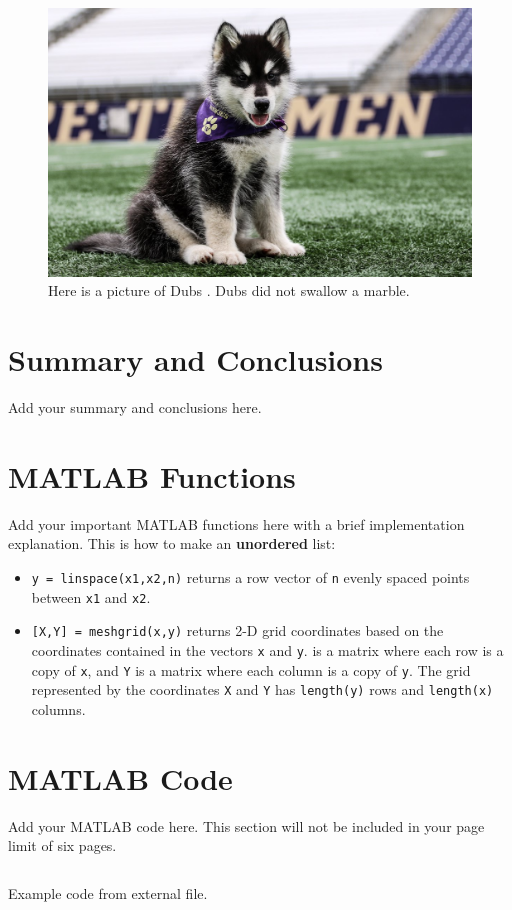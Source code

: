 \documentclass{article}
\begin{document}
\begin{figure}
    \centering
    \includegraphics[width=0.5\linewidth]{dubs.jpg}
    \caption{Here is a picture of Dubs \cite{webeck_2018}. Dubs did not swallow
        a marble.}
    \label{fig:dubs}
\end{figure}

\section{Summary and Conclusions}
Add your summary and conclusions here.

\printbibliography

\begin{appendices}

    \section{MATLAB Functions}
    Add your important MATLAB functions here with a brief implementation
    explanation. This is how to make an \textbf{unordered} list:
    \begin{itemize}
        \item \texttt{y = linspace(x1,x2,n)} returns a row vector of \texttt{n}
              evenly spaced points between \texttt{x1} and \texttt{x2}.
        \item \texttt{[X,Y] = meshgrid(x,y)} returns 2-D grid coordinates based
              on the coordinates contained in the vectors \texttt{x} and
              \texttt{y}.  is a matrix where each row is a copy of
              \texttt{x}, and \texttt{Y} is a matrix where each column is a copy
              of \texttt{y}. The grid represented by the coordinates \texttt{X}
              and \texttt{Y} has \texttt{length(y)} rows and \texttt{length(x)}
              columns.
    \end{itemize}

    \section{MATLAB Code}
    Add your MATLAB code here. This section will not be included in your page
    limit of six pages.

    \begin{listing}[h]
        \inputminted{matlab}{example.m}
        \caption{Example code from external file.}
        \label{listing:examplecode}
    \end{listing}

\end{appendices}
\end{document}
